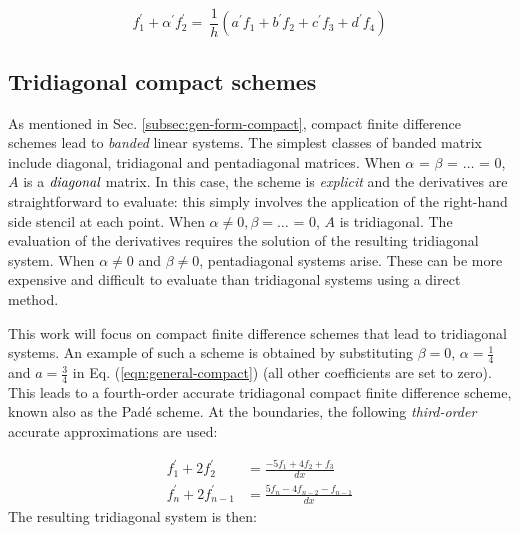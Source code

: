\begin{equation}
    f_1^{\prime} + \alpha^{\prime}f_2^{\prime} = \
        \frac{1}{h}(a^{\prime}f_1 + b^{\prime}f_2 + c^{\prime}f_3 + d^{\prime}f_4)
\label{eqn:boundary-compact}
\end{equation}

\subsection{Tridiagonal compact schemes}
\label{sec:tridiagonal-compact-schemes}

As mentioned in Sec. \ref{subsec:gen-form-compact},
compact finite difference schemes lead to
\emph{banded} linear systems.
The simplest classes of banded matrix include
diagonal, tridiagonal and pentadiagonal matrices.
When $\alpha$ = $\beta$ = $\hdots$ = 0,
$A$ is a $\emph{diagonal}$ matrix.
In this case, the
scheme is \emph{explicit}
and the derivatives are straightforward to evaluate:
this simply involves the
application of the right-hand side stencil at each point.
When $\alpha \neq 0, \beta = \hdots$ = 0,
$A$ is tridiagonal.
The evaluation of the derivatives requires
the solution of the resulting tridiagonal system.
When $\alpha \neq 0$ and $\beta \neq  0$,
pentadiagonal systems arise.
These can be more expensive and difficult to evaluate
than tridiagonal systems
using a direct method.

This work will focus on
compact finite difference schemes that lead
to tridiagonal systems.
An example of such a scheme is obtained
by substituting 
$\beta = 0$, $\alpha = \frac{1}{4}$ and $a = \frac{3}{4}$
in Eq. (\ref{eqn:general-compact})
(all other coefficients are set to zero).
This leads to a fourth-order accurate
tridiagonal compact finite difference scheme,
known also as the Pad\'{e} scheme.
At the boundaries,
the following \emph{third-order} accurate
approximations are used:

\begin{align}
    f^{\prime}_1 + 2f^{\prime}_2 &= \frac{-5f_1 + 4f_2 + f_3}{dx} \\
    f^{\prime}_{n} + 2f^{\prime}_{n-1}
    &=
    \frac{5f_{n} - 4f_{n-2} -  f_{n-1}}{dx}
\end{align}
%
The resulting tridiagonal system is then:

